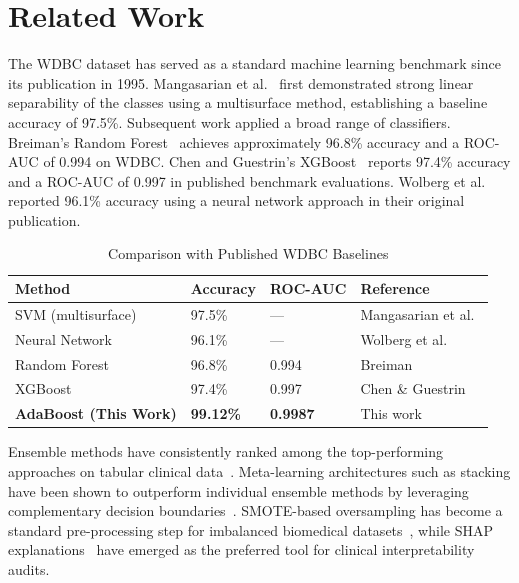 \documentclass[10pt,letterpaper]{article}
\begin{document}
\section{Related Work}

The WDBC dataset has served as a standard machine learning benchmark since its publication in
1995. Mangasarian et al.~\cite{mangasarian1995} first demonstrated strong linear separability of
the classes using a multisurface method, establishing a baseline accuracy of 97.5\%. Subsequent
work applied a broad range of classifiers. Breiman's Random
Forest~\cite{breiman2001} achieves approximately 96.8\% accuracy and a ROC-AUC of 0.994 on WDBC.
Chen and Guestrin's XGBoost~\cite{chen2016} reports 97.4\% accuracy and a ROC-AUC of 0.997 in
published benchmark evaluations. Wolberg et al.~\cite{wolberg1995} reported 96.1\% accuracy using
a neural network approach in their original publication.

\begin{table}[h]
\centering
\caption{Comparison with Published WDBC Baselines}
\label{tab:prior_work}
\begin{tabular}{llll}
\toprule
\textbf{Method} & \textbf{Accuracy} & \textbf{ROC-AUC} & \textbf{Reference} \\
\midrule
SVM (multisurface) & 97.5\% & --- & Mangasarian et al.~\cite{mangasarian1995} \\
Neural Network & 96.1\% & --- & Wolberg et al.~\cite{wolberg1995} \\
Random Forest & 96.8\% & 0.994 & Breiman~\cite{breiman2001} \\
XGBoost & 97.4\% & 0.997 & Chen \& Guestrin~\cite{chen2016} \\
\textbf{AdaBoost (This Work)} & \textbf{99.12\%} & \textbf{0.9987} & This work \\
\bottomrule
\end{tabular}
\end{table}

Ensemble methods have consistently ranked among the top-performing approaches on tabular clinical
data~\cite{breiman2001,friedman2001,chen2016}. Meta-learning architectures such as stacking have
been shown to outperform individual ensemble methods by leveraging complementary decision
boundaries~\cite{freund1997}. SMOTE-based oversampling has become a standard pre-processing step
for imbalanced biomedical datasets~\cite{chawla2002}, while SHAP explanations~\cite{lundberg2017}
have emerged as the preferred tool for clinical interpretability audits.
\end{document}
